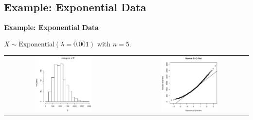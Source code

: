 \documentclass[compress]{beamer}        %
\makeatletter
\newcommand{\tcb}{\textcolor{beamer@blendedblue}}
\makeatother
\begin{document}
\subsection{Example: Exponential Data}
\begin{frame}{\bf \tcb{Example: Exponential Data}}

$X \sim \text{Exponential}(\lambda=0.001)$ with $\boxed{n=5}$.

\begin{adjustwidth}{-0.2cm}{}
\begin{tabular}{c@{}c@{}c}
\includegraphics[width=0.5\textwidth, trim = 0.0cm 0.5cm 0.3cm 0.5cm, clip]{ExpHist5}
&&
\includegraphics[width=0.5\textwidth, trim = 0.0cm 0.5cm 0.3cm 0.5cm, clip]{ExpNorm5}
\end{tabular}
\end{adjustwidth}

\end{frame}

%
\end{document}
